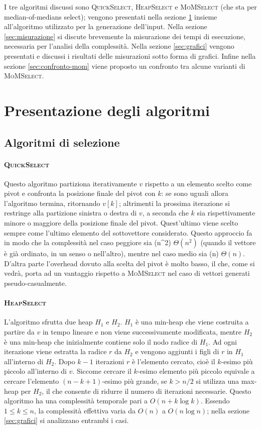 \documentclass[a4paper,12pt]{article}
\newcommand{\QuickSelect}{\textsc{QuickSelect}}
\newcommand{\HeapSelect}{\textsc{HeapSelect}}
\newcommand{\MoMSelect}{\textsc{MoMSelect}}
\newcommand{\Tquad}{\ifmmode \Theta(n^2) \else $\Theta(n^2)$\fi} %
\newcommand{\Tlin}{\ifmmode \Theta(n) \else $\Theta(n)$\fi} %
\begin{document}
I tre algoritmi discussi sono \QuickSelect{}, \HeapSelect{} e \MoMSelect{} (che sta per median-of-medians select); vengono presentati nella sezione \ref{sec:presentazione-algoritmi} insieme all'algoritmo utilizzato per la generazione dell'input.
Nella sezione \ref{sec:misurazione} si discute brevemente la misurazione dei tempi di esecuzione, necessaria per l'analisi della complessità.
Nella sezione \ref{sec:grafici} vengono presentati e discussi i risultati delle misurazioni sotto forma di grafici.
Infine nella sezione \ref{sec:confronto-mom} viene proposto un confronto tra alcune varianti di \MoMSelect{}.



\section{Presentazione degli algoritmi}
\label{sec:presentazione-algoritmi}

\subsection{Algoritmi di selezione}
\paragraph{\QuickSelect}
Questo algoritmo partiziona iterativamente $v$ rispetto a un elemento scelto come pivot e confronta la posizione finale del pivot con $k$: se sono uguali allora l'algoritmo termina, ritornando $v[k]$; altrimenti la prossima iterazione si restringe alla partizione sinistra o destra di $v$, a seconda che $k$ sia rispettivamente minore o maggiore della posizione finale del pivot.
Quest'ultimo viene scelto sempre come l'ultimo elemento del sottovettore considerato.
Questo approccio fa in modo che la complessità nel caso peggiore sia \Tquad{} (quando il vettore è già ordinato, in un senso o nell'altro), mentre nel caso medio sia \Tlin.
D'altra parte l'overhead dovuto alla scelta del pivot è molto basso, il che, come si vedrà, porta ad un vantaggio rispetto a \MoMSelect{} nel caso di vettori generati pseudo-casualmente.

\paragraph{\HeapSelect}
L'algoritmo sfrutta due heap $H_1$ e $H_2$.
$H_1$ è una min-heap che viene costruita a partire da $v$ in tempo lineare e non viene successivamente modificata, mentre $H_2$ è una min-heap che inizialmente contiene solo il nodo radice di $H_1$.
Ad ogni iterazione viene estratta la radice $r$ da $H_2$ e vengono aggiunti i figli di $r$ in $H_1$ all'interno di $H_2$.
Dopo $k-1$ iterazioni $r$ è l'elemento cercato, cioè il $k$-esimo più piccolo all'interno di $v$.
Siccome cercare il $k$-esimo elemento più piccolo equivale a cercare l'elemento $(n-k+1)$-esimo più grande, se $k>n/2$ si utilizza una max-heap per $H_2$, il che consente di ridurre il numero di iterazioni necessarie.
Questo algoritmo ha una complessità temporale pari a $O(n+k\log k)$.
Essendo $1 \le k \le n$, la complessità effettiva varia da $O(n)$ a $O(n\log n)$; nella sezione \ref{sec:grafici} si analizzano entrambi i casi.
\end{document}
